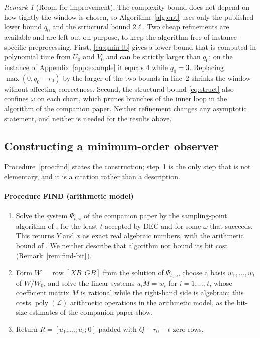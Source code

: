 ﻿\documentclass[journal]{IEEEtran}
\theoremstyle{plainn}
\theoremstyle{remark}
\newtheorem{remark}{Remark}
\begin{document}
\begin{remark}[Room for improvement]\label{rem:refine}
The complexity bound does not depend on how tightly the window is chosen, so
Algorithm~\ref{alg:opt} uses only the published lower bound $q_0$ and the structural bound $2\ell$.
Two cheap refinements are available and are left out on purpose, to keep the algorithm free of
instance-specific preprocessing. First, \eqref{eq:qmin-lb} gives a lower bound that is computed in
polynomial time from $U_0$ and $V_0$ and can be strictly larger than $q_0$; on the instance of
Appendix~\ref{app:example} it equals $4$ while $q_0=3$. Replacing $\max(0,q_0-r_0)$ by the larger of
the two bounds in line~2 shrinks the window without affecting correctness. Second, the structural
bound \eqref{eq:struct} also confines $\omega$ on each chart, which prunes branches of the inner loop
in the algorithm of the companion paper. Neither refinement changes any asymptotic statement, and
neither is
needed for the results above.
\end{remark}

\subsection{Constructing a minimum-order observer}\label{sec:construct}

Procedure~\ref{proc:find} states the construction; step~1 is the only step that is not elementary,
and it is a citation rather than a description.

\paragraph*{Procedure FIND (arithmetic model)}\label{proc:find}
\begin{enumerate}
\item Solve the system $\Psi_{t,\omega}$ of the companion paper by the sampling-point algorithm of
\cite[Ch.~13]{bpr06}, for the least $t$ accepted by $\mathrm{DEC}$ and for some $\omega$ that
succeeds. This returns $Y$ and $x$ as exact real algebraic numbers, with the arithmetic bound of
\cite[Ch.~13]{bpr06}. We neither describe that algorithm nor bound its bit cost
(Remark~\ref{rem:find-bit}).
\item Form $W=\operatorname{row}[XB\ \ GB]$ from the solution of $\Psi_{t,\omega}$, choose a basis
$w_1,\dots,w_t$ of $W/W_0$, and solve the
linear systems $u_iM=w_i$ for $i=1,\dots,t$, whose coefficient matrix $M$ is rational while the
right-hand side is algebraic; this costs $\operatorname{poly}(\mathcal L)$ arithmetic operations in the
arithmetic model, as the bit-size estimates of the companion paper show.
\item Return $R=[u_1;\dots;u_t;0]$ padded with $Q-r_0-t$ zero rows.
\end{enumerate}
\end{document}

